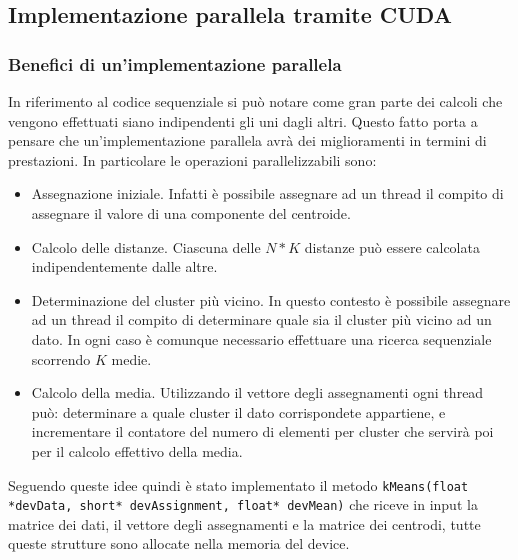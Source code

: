 \documentclass[10pt,twocolumn,letterpaper]{article}
\begin{document}

\subsection{Implementazione parallela tramite CUDA}
\label{sub:cudaimpl}
\subsubsection{Benefici di un'implementazione parallela}
\label{sec:benefici}
In riferimento al codice sequenziale si può notare come gran parte dei calcoli che vengono effettuati siano indipendenti gli uni dagli altri. Questo fatto porta a pensare che un'implementazione parallela avrà dei miglioramenti in termini di prestazioni. In particolare le operazioni parallelizzabili sono:
\begin{itemize}
	\item{Assegnazione iniziale. Infatti è possibile assegnare ad un thread il compito di assegnare il valore di una componente del centroide.}
	\item{Calcolo delle distanze. Ciascuna delle $N*K$ distanze può essere calcolata indipendentemente dalle altre.}
	\item{Determinazione del cluster più vicino. In questo contesto è possibile assegnare ad un thread il compito di determinare quale sia il cluster più vicino ad un dato. In ogni caso è comunque necessario effettuare una ricerca sequenziale scorrendo $K$ medie.}
	\item{Calcolo della media. Utilizzando il vettore degli assegnamenti ogni thread può: determinare a quale cluster il dato corrispondete appartiene, e incrementare il contatore del numero di elementi per cluster che servirà poi per il calcolo effettivo della media. }
\end{itemize}
Seguendo queste idee quindi è stato implementato il metodo \texttt{kMeans(float *devData, short* devAssignment, float* devMean)} che riceve in input la matrice dei dati, il vettore degli assegnamenti e la matrice dei centrodi, tutte queste strutture sono allocate nella memoria del device.
\end{document}
